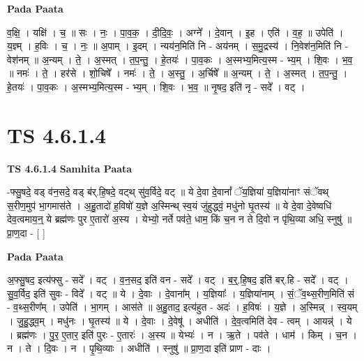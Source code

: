 \documentclass[17pt]{extarticle}
\begin{document}
\textbf{Pada Paata} \newline

व॒क्षि॒ । यक्षि॑ । च॒ ॥ सः । नः॒ । पा॒व॒क॒ । दी॒दि॒वः॒ । अग्ने᳚ । दे॒वान् । इ॒ह । एति॑ । व॒ह॒ ॥ उपेति॑ । य॒ज्ञ्म् । ह॒विः । च॒ । नः॒ ॥ अ॒पाम् । इ॒दम् । न्यय॑न॒मिति॑ नि - अय॑नम् । स॒मु॒द्रस्य॑ । नि॒वेश॑न॒मिति॑ नि - वेश॑नम् ॥ अ॒न्यम् । ते॒ । अ॒स्मत् । त॒प॒न्तु॒ । हे॒तयः॑ । पा॒व॒कः । अ॒स्मभ्य॒मित्य॒स्म - भ्य॒म् । शि॒वः । भ॒व॒ ॥ नमः॑ । ते॒ । हर॑से । शो॒चिषे᳚ । नमः॑ । ते॒ । अ॒स्तु॒ । अ॒र्चिषे᳚ ॥ अ॒न्यम् । ते॒ । अ॒स्मत् । त॒प॒न्तु॒ । हे॒तयः॑ । पा॒व॒कः । अ॒स्मभ्य॒मित्य॒स्म - भ्य॒म् । शि॒वः । भ॒व॒ ॥ नृ॒षद॒ इति॑ नृ - सदे᳚ । वट् ।  \newline




\section*{ TS 4.6.1.4 }

\textbf{TS 4.6.1.4 } \newline
\textbf{Samhita Paata} \newline

-फ्सु॒षदे॒ वड् व॑न॒सदे॒ वड् ब॑र्.हि॒षदे॒ वट्थ् सु॑व॒र्विदे॒ वट् ॥ ये दे॒वा दे॒वानां᳚ ॅय॒ज्ञिया॑ य॒ज्ञिया॑नाꣳ संॅवथ् स॒रीण॒मुप॑ भा॒गमास॑ते । अ॒हु॒तादो॑ ह॒विषो॑ य॒ज्ञे अ॒स्मिन्थ् स्व॒यं जु॑हुद्ध्वं॒ मधु॑नो घृ॒तस्य॑ ॥ ये दे॒वा दे॒वेष्वधि॑ देव॒त्वमाय॒न्॒ ये ब्रह्म॑णः पुर ए॒तारो॑ अ॒स्य । येभ्यो॒ नर्ते पव॑ते॒ धाम॒ किं च॒न न ते दि॒वो न पृ॑थि॒व्या अधि॒ स्नुषु॑ ॥ प्रा॒ण॒दा - [  ] \newline

\textbf{Pada Paata} \newline

अ॒फ्सु॒षद॒ इत्य॑फ्सु - सदे᳚ । वट् । व॒न॒सद॒ इति॑ वन - सदे᳚ । वट् । ब॒र्॒.हि॒षद॒ इति॑ बर्.हि - सदे᳚ । वट् । सु॒व॒र्विद॒ इति॑ सुवः - विदे᳚ । वट् ॥ ये । दे॒वाः । दे॒वाना᳚म् । य॒ज्ञियाः᳚ । य॒ज्ञिया॑नाम् । सं॒ॅव॒थ्स॒रीण॒मिति॑ सं - व॒थ्स॒रीण᳚म् । उपेति॑ । भा॒गम् । आस॑ते ॥ अ॒हु॒ताद॒ इत्य॑हुत - अदः॑ । ह॒विषः॑ । य॒ज्ञे । अ॒स्मिन्न् । स्व॒यम् । जु॒हु॒द्ध्व॒म् । मधु॑नः । घृ॒तस्य॑ ॥ ये । दे॒वाः । दे॒वेषू॑ । अधीति॑ । दे॒व॒त्वमिति॑ देव - त्वम् । आयन्न्॑ । ये । ब्रह्म॑णः । पु॒र॒ ए॒तार॒ इति॑ पुरः - ए॒तारः॑ । अ॒स्य ॥ येभ्यः॑ । न । ऋ॒ते । पव॑ते । धाम॑ । किम् । च॒न । न । ते । दि॒वः । न । पृ॒थि॒व्याः । अधीति॑ । स्नुषु॑ ॥ प्रा॒ण॒दा इति॑ प्राण - दाः ।  \newline
\end{document}
